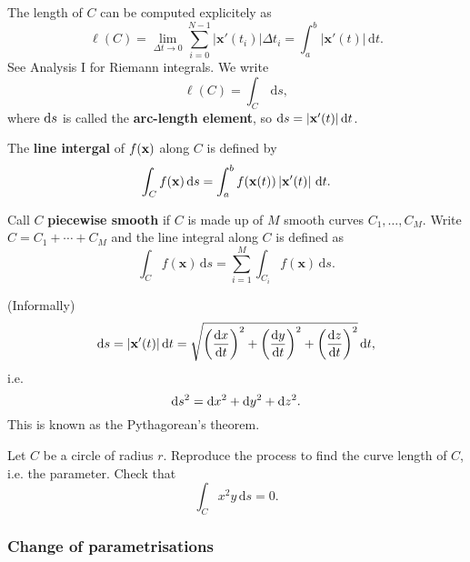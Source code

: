 \begin{definition}
    The length of $C$ can be computed explicitely as 
    \[
        \ell (C) = \lim_{\Delta t \to 0} \sum_{i=0}^{N-1} \left| \mathbf{x}'(t_i) \right| \Delta t_i = \int_{a}^{b} \left| \mathbf{x}'(t) \right|  \,\mathrm{d}t.
    \]
    See Analysis I for Riemann integrals. We write 
    \[
        \ell (C) = \int_{C} \,\mathrm{d}s,
    \]
    where $ \mathrm{d} s $ is called the \textbf{arc-length element}, so $ \mathrm{d} s = |\mathbf{x}'(t)| \,\mathrm{d} t $.
\end{definition}
\begin{definition}
    The \textbf{line intergal} of $f({\bf x})$ along $C$ is defined by 
    \[
        \int_{C} f(\mathbf{x}) \,\mathrm{d}s = \int_{a}^{b} f(\mathbf{x}(t)) \left| {\bf x}'(t) \right| \,\mathrm{d}t.
    \]
\end{definition}
\begin{definition}
    Call $C$ \textbf{piecewise smooth} if $C$ is made up of $M$ smooth curves $ C_1,\dots,C_M $. Write $C=C_1+\cdots+C_M$ and the line integral along $C$ is defined as 
    \[
        \int_{C} f(\mathbf{x}) \,\mathrm{d}s = \sum_{i=1}^{M}\int_{C_i} f(\mathbf{x}) \,\mathrm{d}s.
    \]
\end{definition}
\begin{note}
    (Informally) 
    \[
        \mathrm{d} s = |\mathbf{x}'(t)|\,\mathrm{d} t = \sqrt{\left( \frac{\mathrm{d}x}{\mathrm{d}t}  \right)^2+\left(\frac{\mathrm{d}y}{\mathrm{d}t}  \right)^2+\left(\frac{\mathrm{d}z}{\mathrm{d}t}  \right)^2}\,\mathrm{d} t,
    \]
    i.e.
    \[
        \mathrm{d} s^2 = \mathrm{d} x^2+\mathrm{d} y^2+\mathrm{d} z^2.
    \]
    This is known as the Pythagorean's theorem.
\end{note}
\begin{example}
    Let $C$ be a circle of radius $r$. Reproduce the process to find the curve length of $C$, i.e. the parameter. Check that 
    \[
        \int_{C} x^2y \,\mathrm{d}s = 0.
    \]
\end{example}

\subsubsection*{Change of parametrisations}

